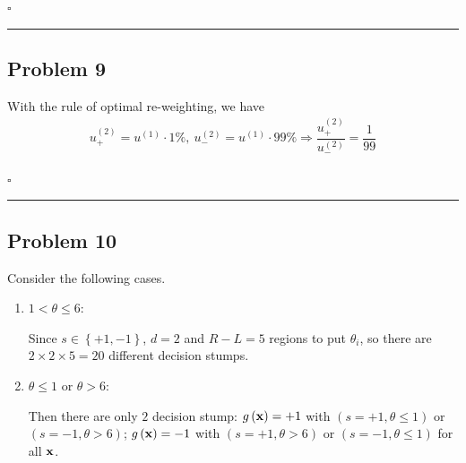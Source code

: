 \documentclass[12pt]{article}
\newcommand*{\QEDB}{\hfill\ensuremath{\square}}
\newcommand{\CBrackets}[1]{\left\{#1\right\}}
\newcommand{\ParTh}[1]{\left(#1\right)}
\newcommand{\BF}[1]{{\bf#1}}
\newcommand{\horrule}[1]{\rule{\linewidth}{#1}}
\begin{document}
\QEDB

\horrule{0.5pt}

\subsection*{Problem 9}

With the rule of optimal re-weighting, we have
\begin{align}
u^{\ParTh{2}}_+=u^{\ParTh{1}}\cdot1\%,~u^{\ParTh{2}}_-=u^{\ParTh{1}}\cdot99\%\Rightarrow\dfrac{u^{\ParTh{2}}_+}{u^{\ParTh{2}}_-}=\dfrac{1}{99}
\end{align}

\QEDB

\horrule{0.5pt}

\subsection*{Problem 10}

Consider the following cases.
\begin{enumerate}
	\item $1<\theta\leq6$:
	
	Since $s\in\CBrackets{+1,-1}$, $d=2$ and $R-L=5$ regions to put $\theta_i$, so there are $2\times2\times5=20$ different decision stumps.
	\item $\theta\leq1$ or $\theta>6$:
	
	Then there are only $2$ decision stump: $g\ParTh{\BF{x}}=+1$ with $\ParTh{s=+1,\theta\leq1}$ or $\ParTh{s=-1,\theta>6}$; $g\ParTh{\BF{x}}=-1$ with $\ParTh{s=+1,\theta>6}$ or $\ParTh{s=-1,\theta\leq1}$ for all $\BF{x}$.
\end{enumerate}

\end{document}
